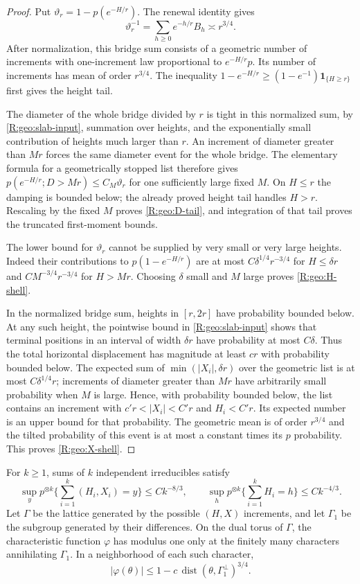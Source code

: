 \begin{proof}
Put $\vartheta_r=1-p(e^{-H/r})$.  The renewal identity gives
\[
 \vartheta_r^{-1}=\sum_{h\ge0}e^{-h/r}B_h\asymp r^{3/4}.
\]
After normalization, this bridge sum consists of a geometric number of
increments with one-increment law proportional to $e^{-H/r}p$.
Its number of increments has mean of order $r^{3/4}$.
The inequality $1-e^{-H/r}\ge(1-e^{-1})\mathbf1_{\{H\ge r\}}$
first gives the height tail.

The diameter of the whole bridge divided by $r$ is tight in this
normalized sum, by \eqref{R:geo:slab-input}, summation over heights, and
the exponentially small contribution of heights much larger than $r$.
An increment of diameter greater than $Mr$ forces the same diameter
event for the whole bridge.  The elementary formula for a geometrically
stopped list therefore gives
$p(e^{-H/r};D>Mr)\le C_M\vartheta_r$ for one sufficiently large fixed $M$.
On $H\le r$ the damping is bounded below; the already proved height
tail handles $H>r$.  Rescaling by the fixed $M$ proves
\eqref{R:geo:D-tail}, and integration of that tail proves the truncated
first-moment bounds.

The lower bound for $\vartheta_r$ cannot be supplied by very small or very large
heights.  Indeed their contributions to $p(1-e^{-H/r})$ are at most
$C\delta^{1/4}r^{-3/4}$ for $H\le\delta r$ and
$C M^{-3/4}r^{-3/4}$ for $H>Mr$.  Choosing $\delta$ small and $M$
large proves \eqref{R:geo:H-shell}.

In the normalized bridge sum, heights in $[r,2r]$ have probability
bounded below.  At any such height, the pointwise bound in
\eqref{R:geo:slab-input} shows that terminal positions in an interval
of width $\delta r$ have probability at most $C\delta$.  Thus the
total horizontal displacement has magnitude at least $c r$ with
probability bounded below.  The expected sum of
$\min(|X_i|,\delta r)$ over the geometric list is at most
$C\delta^{1/4}r$; increments of diameter greater than $Mr$ have
arbitrarily small probability when $M$ is large.  Hence, with probability
bounded below, the list contains an increment with
$c' r<|X_i|<C'r$ and $H_i<C'r$.  Its expected number is an upper bound
for that probability.  The geometric mean is of order $r^{3/4}$ and
the tilted probability of this event is at most a constant times its
$p$ probability.  This proves \eqref{R:geo:X-shell}.
\end{proof}
\begin{lemma}\label{R:geo:atoms}
For $k\ge1$, sums of $k$ independent irreducibles satisfy
\[
 \sup_y p^{\otimes k}\{\textstyle\sum_{i=1}^k(H_i,X_i)=y\}
       \le C k^{-8/3},\qquad
 \sup_h p^{\otimes k}\{\textstyle\sum_{i=1}^kH_i=h\}
       \le C k^{-4/3}.
\]
Let $\Gamma$ be the lattice generated by the possible $(H,X)$
increments, and let $\Gamma_1$ be the subgroup generated by their
differences.  On the dual torus of $\Gamma$, the characteristic function
$\varphi$ has modulus one only at the finitely many characters
annihilating $\Gamma_1$.  In a neighborhood of each such character,
\[
       |\varphi(\theta)|\le1-c\,\operatorname{dist}
                  (\theta,\Gamma_1^\perp)^{3/4}.
\]
\end{lemma}
